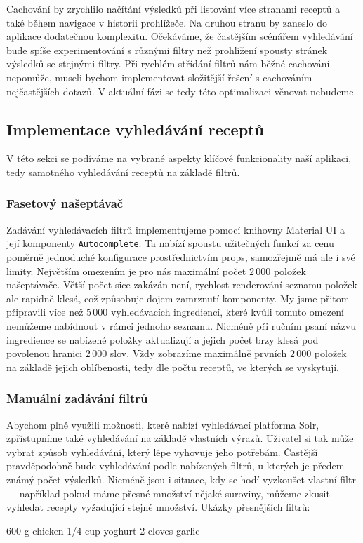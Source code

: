 Cachování by zrychlilo načítání výsledků při listování více stranami receptů a také během navigace v historii prohlížeče. Na druhou stranu by zaneslo do aplikace dodatečnou komplexitu. Očekáváme, že častějším scénářem vyhledávání bude spíše experimentování s různými filtry než prohlížení spousty stránek výsledků se stejnými filtry. Při rychlém střídání filtrů nám běžné cachování nepomůže, museli bychom implementovat složitější řešení s cachováním nejčastějších dotazů. V aktuální fázi se tedy této optimalizaci věnovat nebudeme.

\subsection{Implementace vyhledávání receptů}

V této sekci se podíváme na vybrané aspekty klíčové funkcionality naší aplikaci, tedy samotného vyhledávání receptů na základě filtrů.

\subsubsection{Fasetový našeptávač}

Zadávání vyhledávacích filtrů implementujeme pomocí knihovny Material UI a její komponenty \texttt{Autocomplete}. Ta nabízí spoustu užitečných funkcí za cenu poměrně jednoduché konfigurace prostřednictvím props, samozřejmě má ale i své limity. Největším omezením je pro nás maximální počet $2\,000$ položek našeptávače. Větší počet sice zakázán není, rychlost renderování seznamu položek ale rapidně klesá, což způsobuje dojem zamrznutí komponenty. My jsme přitom připravili více než  $5\,000$ vyhledávacích ingrediencí, které kvůli tomuto omezení nemůžeme nabídnout v rámci jednoho seznamu. Nicméně při ručním psaní názvu ingredience se nabízené položky aktualizují a jejich počet brzy klesá pod povolenou hranici $2\,000$ slov. Vždy zobrazíme maximálně prvních $2\,000$ položek na základě jejich oblíbenosti, tedy dle počtu receptů, ve kterých se vyskytují.

\subsubsection{Manuální zadávání filtrů}

Abychom plně využili možnosti, které nabízí vyhledávací platforma Solr, zpřístupníme také vyhledávání na základě vlastních výrazů. Uživatel si tak může vybrat způsob vyhledávání, který lépe vyhovuje jeho potřebám. Častější pravděpodobně bude vyhledávání podle nabízených filtrů, u kterých je předem známý počet výsledků. Nicméně jsou i situace, kdy se hodí vyzkoušet vlastní filtr --- například pokud máme přesné množství nějaké suroviny, můžeme zkusit vyhledat recepty vyžadující stejné množství. Ukázky přesnějších filtrů:
\begin{code}
600 g chicken
1/4 cup yoghurt
2 cloves garlic
\end{code}

